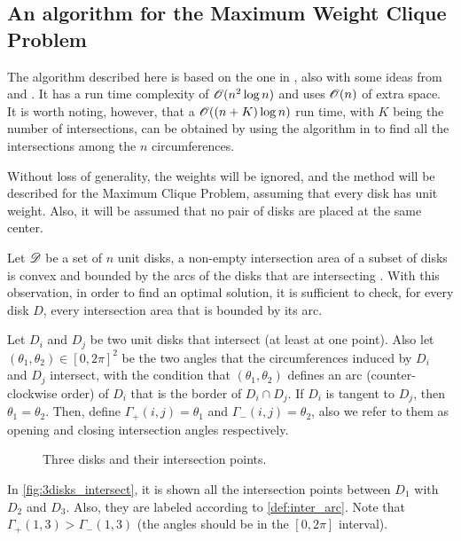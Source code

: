 \subsection{An algorithm for the Maximum Weight Clique Problem}

The algorithm described here is based on the one in \cite{drezner}, also with some ideas from \cite{inplace:2014} and \cite{cabello:2006}. It has a run time complexity of $\mathscr{O}(n^2\log{n})$ and uses $\mathscr{O}(n)$ of extra space. It is worth noting, however, that a $\mathscr{O}((n+K)\log{n})$ run time, with $K$ being the number of intersections, can be obtained by using the algorithm in \cite{bentley:1979} to find all the intersections among the $n$ circumferences.

Without loss of generality, the weights will be ignored, and the method will be described for the Maximum Clique Problem, assuming that every disk has unit weight. Also, it will be assumed that no pair of disks are placed at the same center.

Let $\mathscr{D}$ be a set of $n$ unit disks, a non-empty intersection area of a subset of disks is convex and bounded by the arcs of the disks that are intersecting \cite{inplace:2014}.
With this observation, in order to find an optimal solution, it is sufficient to check, for every disk $D$, every intersection area that is bounded by its arc.

\begin{definicao}\label{def:inter_arc}
    Let $D_i$ and $D_j$ be two unit disks that intersect (at least at one point). Also let $(\theta_1, \theta_2) \in [0,2\pi]^2$ be the two angles that the circumferences induced by $D_i$ and $D_j$ intersect, with the condition that $(\theta_1,\theta_2)$ defines an arc (counter-clockwise order) of $D_i$ that is the border of $D_i \cap D_j$. If $D_i$ is tangent to $D_j$, then $\theta_1=\theta_2$. Then, define $\Gamma_+(i,j) = \theta_1$ and $\Gamma_-(i,j) = \theta_2$, also we refer to them as opening and closing intersection angles respectively.
\end{definicao}

\begin{figure}[H]
\centering

    \caption{Three disks and their intersection points.}
    
    \fautor
    \label{fig:3disks_intersect}
\end{figure}

In \autoref{fig:3disks_intersect}, it is shown all the intersection points between $D_1$ with $D_2$ and $D_3$. Also, they are labeled according to \autoref{def:inter_arc}. Note that $\Gamma_+(1,3) > \Gamma_-(1,3)$ (the angles should be in the $[0,2\pi]$ interval).

